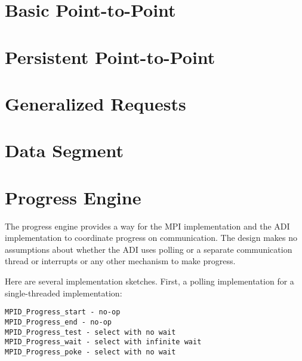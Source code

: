 \documentclass{article}
\begin{document}
\section{Basic Point-to-Point}
\label{sec:pt-2-pt}















\section{Persistent Point-to-Point}
\label{sec:persistent}






\section{Generalized Requests}
\label{sec:grequests}



\section{Data Segment}
\label{sec:segment-fcns}






\section{Progress Engine}
\label{sec:progress}
The progress engine provides a way for the MPI implementation and the
ADI implementation to coordinate progress on communication.  The
design makes no assumptions about whether the ADI uses polling or a
separate communication thread or interrupts or any other mechanism to
make progress.  

Here are several implementation sketches.
First, a polling implementation for a single-threaded implementation:
\begin{verbatim}
MPID_Progress_start - no-op
MPID_Progress_end - no-op
MPID_Progress_test - select with no wait
MPID_Progress_wait - select with infinite wait
MPID_Progress_poke - select with no wait
\end{verbatim}
\end{document}
